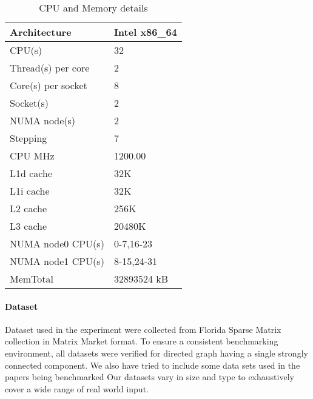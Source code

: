\begin{table}[th]
\begin{center} %
    \begin{tabular}{| l | l |}
    \hline
    Architecture & Intel x86\_64\\ \hline
    CPU(s) & 32\\ \hline
    Thread(s) per core & 2\\ \hline
	Core(s) per socket & 8\\ \hline
	Socket(s) & 2\\ \hline
	NUMA node(s) & 2\\ \hline
	Stepping & 7\\ \hline
	CPU MHz & 1200.00\\ \hline
	L1d cache & 32K\\ \hline
	L1i cache & 32K\\ \hline
	L2 cache & 256K\\ \hline
	L3 cache & 20480K\\ \hline
	NUMA node0 CPU(s) & 0-7,16-23\\ \hline
	NUMA node1 CPU(s) & 8-15,24-31\\ \hline
	MemTotal & 32893524 kB\\ \hline
    \hline
    \end{tabular}
\end{center}
\caption{\capfont CPU and Memory details}
\label{tab:Table1}
\end{table}

\paragraph{Dataset}
Dataset used in the experiment were collected from Florida
Sparse Matrix collection in Matrix Market format.  To ensure a
consistent benchmarking environment, all datasets were verified for
directed graph having a single strongly connected component.  We also
have tried to include some data sets used in the papers being benchmarked
Our datasets vary in size and type to exhaustively cover a wide
range of real world input.

